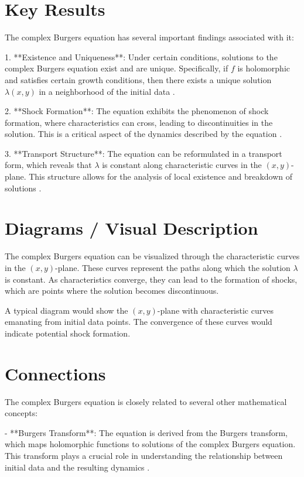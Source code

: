 \documentclass[11pt,a4paper]{article}
\begin{document}
\section{Key Results}
The complex Burgers equation has several important findings associated with it:

1. **Existence and Uniqueness**: Under certain conditions, solutions to the complex Burgers equation exist and are unique. Specifically, if $f$ is holomorphic and satisfies certain growth conditions, then there exists a unique solution $\lambda(x, y)$ in a neighborhood of the initial data \cite{2602.19251v1}.

2. **Shock Formation**: The equation exhibits the phenomenon of shock formation, where characteristics can cross, leading to discontinuities in the solution. This is a critical aspect of the dynamics described by the equation \cite{2602.19251v1}.

3. **Transport Structure**: The equation can be reformulated in a transport form, which reveals that $\lambda$ is constant along characteristic curves in the $(x, y)$-plane. This structure allows for the analysis of local existence and breakdown of solutions \cite{2602.19251v1}.

\section{Diagrams / Visual Description}
The complex Burgers equation can be visualized through the characteristic curves in the $(x, y)$-plane. These curves represent the paths along which the solution $\lambda$ is constant. As characteristics converge, they can lead to the formation of shocks, which are points where the solution becomes discontinuous.

A typical diagram would show the $(x, y)$-plane with characteristic curves emanating from initial data points. The convergence of these curves would indicate potential shock formation.

\section{Connections}
The complex Burgers equation is closely related to several other mathematical concepts:

- **Burgers Transform**: The equation is derived from the Burgers transform, which maps holomorphic functions to solutions of the complex Burgers equation. This transform plays a crucial role in understanding the relationship between initial data and the resulting dynamics \cite{2602.19251v1}.
\end{document}
